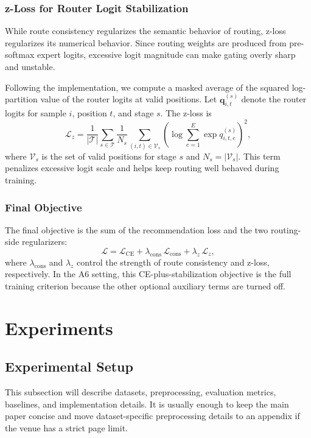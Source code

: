 \documentclass[sigconf,authordraft]{acmart}
\begin{document}
\subsubsection{z-Loss for Router Logit Stabilization}

While route consistency regularizes the semantic behavior of routing, z-loss regularizes its numerical behavior. Since routing weights are produced from pre-softmax expert logits, excessive logit magnitude can make gating overly sharp and unstable.

Following the implementation, we compute a masked average of the squared log-partition value of the router logits at valid positions. Let $\mathbf{q}^{(s)}_{i,t}$ denote the router logits for sample $i$, position $t$, and stage $s$. The z-loss is
\[
\mathcal{L}_{z}
=
\frac{1}{|\mathcal{T}|}
\sum_{s \in \mathcal{T}}
\frac{1}{N_s}
\sum_{(i,t)\in\mathcal{V}_s}
\left(
\log \sum_{e=1}^{E}\exp q_{i,t,e}^{(s)}
\right)^2,
\]
where $\mathcal{V}_s$ is the set of valid positions for stage $s$ and $N_s = |\mathcal{V}_s|$. This term penalizes excessive logit scale and helps keep routing well behaved during training.

\subsubsection{Final Objective}

The final objective is the sum of the recommendation loss and the two routing-side regularizers:
\[
\mathcal{L}
=
\mathcal{L}_{\mathrm{CE}}
+
\lambda_{\mathrm{cons}}\,\mathcal{L}_{\mathrm{cons}}
+
\lambda_{z}\,\mathcal{L}_{z},
\]
where $\lambda_{\mathrm{cons}}$ and $\lambda_z$ control the strength of route consistency and z-loss, respectively. In the A6 setting, this CE-plus-stabilization objective is the full training criterion because the other optional auxiliary terms are turned off.
\section{Experiments}
\label{sec:experiments}

\subsection{Experimental Setup}
This subsection will describe datasets, preprocessing, evaluation metrics, baselines, and implementation details. It is usually enough to keep the main paper concise and move dataset-specific preprocessing details to an appendix if the venue has a strict page limit.
\end{document}
